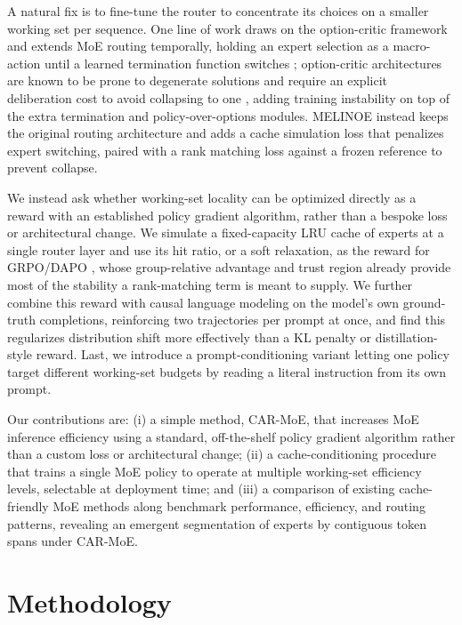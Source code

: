 \documentclass{article}
\begin{document}
A natural fix is to fine-tune the router to concentrate its choices on a smaller working
set per sequence. One line of work draws on the option-critic framework
\citep{bacon2017optioncritic} and extends MoE routing temporally, holding an expert
selection as a macro-action until a learned termination function switches
\citep{shen2026temporal}; option-critic architectures are known to be prone to degenerate
solutions and require an explicit deliberation cost to avoid collapsing to one
\citep{harb2018waiting}, adding training instability on top of the extra termination and
policy-over-options modules. MELINOE \citep{raje2026melinoe} instead keeps the original
routing architecture and adds a cache simulation loss that penalizes expert switching,
paired with a rank matching loss against a frozen reference to prevent collapse.

We instead ask whether working-set locality can be optimized directly as a reward with an
established policy gradient algorithm, rather than a bespoke loss or architectural
change. We simulate a fixed-capacity LRU cache of experts at a single router layer and
use its hit ratio, or a soft relaxation, as the reward for GRPO/DAPO
\citep{shao2024deepseekmath,yu2025dapo}, whose group-relative advantage and trust region
already provide most of the stability a rank-matching term is meant to supply. We further
combine this reward with causal language modeling on the model's own ground-truth
completions, reinforcing two trajectories per prompt at once, and find this regularizes
distribution shift more effectively than a KL penalty or distillation-style reward. Last,
we introduce a prompt-conditioning variant letting one policy target different
working-set budgets by reading a literal instruction from its own prompt.

Our contributions are: (i) a simple method, CAR-MoE, that increases MoE inference
efficiency using a standard, off-the-shelf policy gradient algorithm rather than a custom
loss or architectural change; (ii) a cache-conditioning procedure that trains a single MoE
policy to operate at multiple working-set efficiency levels, selectable at deployment
time; and (iii) a comparison of existing cache-friendly MoE methods along benchmark
performance, efficiency, and routing patterns, revealing an emergent segmentation of
experts by contiguous token spans under CAR-MoE.

\section{Methodology}
\end{document}
